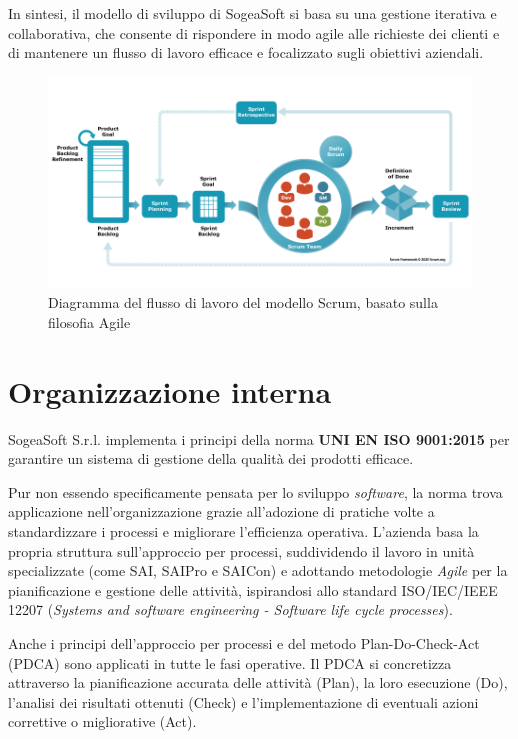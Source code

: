     \noindent In sintesi, il modello di sviluppo di SogeaSoft si basa su una gestione iterativa e collaborativa, che consente di rispondere in modo agile alle richieste dei clienti e di mantenere un flusso di lavoro efficace e focalizzato sugli obiettivi aziendali.

    \begin{figure}[H]
        \centering
        \includegraphics[width=0.8\linewidth]{BCS-Tessi/images/scrum_flow.png}
        \caption{Diagramma del flusso di lavoro del modello Scrum, basato sulla filosofia Agile}
        \label{fig:scrum_flow}
    \end{figure}
    
    \section{Organizzazione interna}
    SogeaSoft S.r.l. implementa i principi della norma \textbf{UNI EN ISO 9001:2015} per garantire un sistema di gestione della qualità dei prodotti efficace.
    
    \noindent Pur non essendo specificamente pensata per lo sviluppo \textit{software}, la norma trova applicazione nell’organizzazione grazie all’adozione di pratiche volte a standardizzare i processi e migliorare l’efficienza operativa. L'azienda basa la propria struttura sull'approccio per processi, suddividendo il lavoro in unità specializzate (come SAI, SAIPro e SAICon) e adottando metodologie \textit{Agile} per la pianificazione e gestione delle attività, ispirandosi allo standard ISO/IEC/IEEE 12207 (\textit{Systems and software engineering - Software life cycle processes}).

    \noindent Anche i principi dell’approccio per processi e del metodo Plan-Do-Check-Act (PDCA) sono applicati in tutte le fasi operative. Il PDCA si concretizza attraverso la pianificazione accurata delle attività (Plan), la loro esecuzione (Do), l’analisi dei risultati ottenuti (Check) e l’implementazione di eventuali azioni correttive o migliorative (Act).


